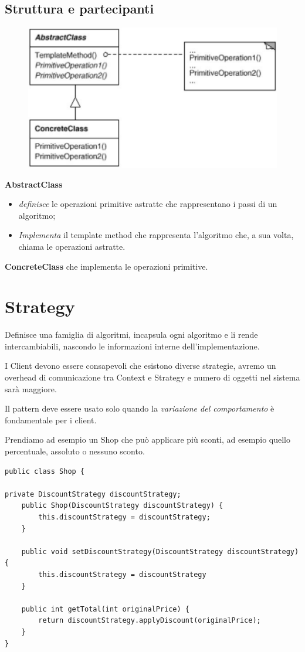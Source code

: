 \subsection{Struttura e partecipanti}

\begin{figure}[H]
    \centering
    \includegraphics[width=0.4\linewidth]{../../immagini/templateMethod_Strategy/struttura_templateMethod}    
\end{figure}

\textbf{AbstractClass} 

\begin{itemize}
    \item \textit{definisce} le operazioni primitive astratte che rappresentano i passi di un algoritmo;
    \item \textit{Implementa} il template method che rappresenta l’algoritmo che, a sua volta, chiama le operazioni astratte.
\end{itemize}

\textbf{ConcreteClass} che implementa le operazioni primitive.

\section{Strategy}

Definisce una famiglia di algoritmi, incapsula ogni algoritmo e li rende intercambiabili, nascondo le informazioni interne dell’implementazione.

I Client devono essere consapevoli che esistono diverse strategie, avremo un overhead di comunicazione tra Context e Strategy e numero di oggetti nel sistema sarà 
maggiore.

Il pattern deve essere usato solo quando la \textit{variazione del comportamento} è fondamentale per i client.

Prendiamo ad esempio un Shop che può applicare più sconti, ad esempio quello percentuale, assoluto o nessuno sconto.

\begin{lstlisting}
public class Shop {

private DiscountStrategy discountStrategy;
    public Shop(DiscountStrategy discountStrategy) {
        this.discountStrategy = discountStrategy;
    }

    public void setDiscountStrategy(DiscountStrategy discountStrategy) {
        this.discountStrategy = discountStrategy
    }

    public int getTotal(int originalPrice) {
        return discountStrategy.applyDiscount(originalPrice);
    }
}
\end{lstlisting}

